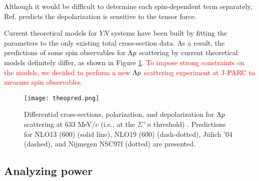 Although it would be difficult to determine each spin-dependent term separately, Ref. \cite{chiEFT-1992} predicts the depolarization is sensitive to the tensor force. 

Current theoretical models for $YN$ systems have been built by fitting the parameters to the only existing total cross-section data. As a result, the predictions of some spin observables for $\Lambda p$ scattering by current theoretical models definitely differ, as shown in Figure \ref{fig-theopred}. \textcolor{red}{To impose strong constraints on the models, we decided to perform a new $\Lambda p$ scattering experiment at J-PARC to measure spin observables.}

\begin{figure}[h!]
 \begin{center}
   \texttt{[image: theopred.png]}
   \caption{Differential cross-sections, polarization, and depolarization for $\Lambda p$ scattering at 633 MeV/$c$ (i.e., at the $\Sigma^{+}n$ threshold) \cite{chiEFT-2021}. Predictions for NLO13 (600) (solid line), NLO19 (600) (dash-dotted), J\"{u}lich '04 (dashed), and Nijmegen NSC97f (dotted) are presented.}
   \label{fig-theopred}
 \end{center}
\end{figure}


\subsection{Analyzing power}
\label{sec-anapow}

